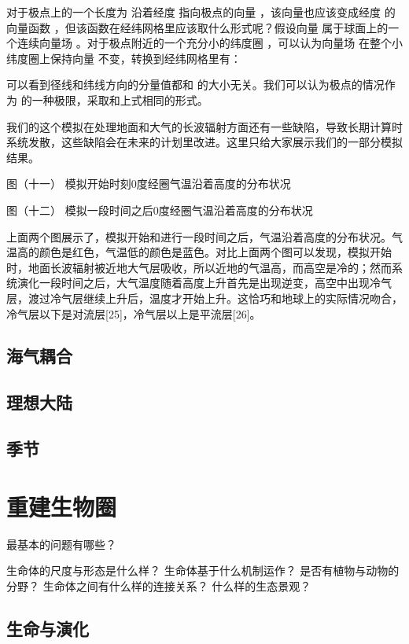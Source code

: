\documentclass[a4paper,10.5pt]{book}
\begin{document}
对于极点上的一个长度为  沿着经度  指向极点的向量  ，该向量也应该变成经度  的向量函数  ，但该函数在经纬网格里应该取什么形式呢？假设向量  属于球面上的一个连续向量场  。对于极点附近的一个充分小的纬度圈 ，可以认为向量场  在整个小纬度圈上保持向量  不变，转换到经纬网格里有：



可以看到径线和纬线方向的分量值都和  的大小无关。我们可以认为极点的情况作为  的一种极限，采取和上式相同的形式。

我们的这个模拟在处理地面和大气的长波辐射方面还有一些缺陷，导致长期计算时系统发散，这些缺陷会在未来的计划里改进。这里只给大家展示我们的一部分模拟结果。


图（十一）
模拟开始时刻0度经圈气温沿着高度的分布状况



图（十二）
模拟一段时间之后0度经圈气温沿着高度的分布状况

上面两个图展示了，模拟开始和进行一段时间之后，气温沿着高度的分布状况。气温高的颜色是红色，气温低的颜色是蓝色。对比上面两个图可以发现，模拟开始时，地面长波辐射被近地大气层吸收，所以近地的气温高，而高空是冷的；然而系统演化一段时间之后，大气温度随着高度上升首先是出现逆变，高空中出现冷气层，渡过冷气层继续上升后，温度才开始上升。这恰巧和地球上的实际情况吻合，冷气层以下是对流层[25]，冷气层以上是平流层[26]。

\section{海气耦合}

\section{理想大陆}

\section{季节}



\chapter{重建生物圈}

最基本的问题有哪些？

生命体的尺度与形态是什么样？
生命体基于什么机制运作？
是否有植物与动物的分野？
生命体之间有什么样的连接关系？
什么样的生态景观？

\section{生命与演化}
\end{document}
